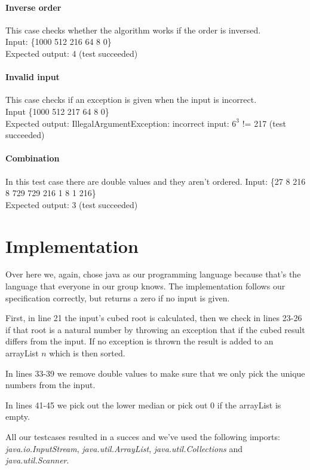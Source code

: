 \documentclass[12pt]{article}
\begin{document}
\paragraph{Inverse order}
This case checks whether the algorithm works if the order is inversed. \\
Input: \{1000 512 216 64 8 0\} \\
Expected output: 4 (test succeeded)

\paragraph{Invalid input}
This case checks if an exception is given when the input is incorrect. \\
Input \{1000 512 217 64 8 0\} \\
Expected output: IllegalArgumentException: incorrect input: $6^3$ != 217 (test succeeded)

\paragraph{Combination}
In this test case there are double values and they aren't ordered.
Input: \{27 8 216 8 729 729 216 1 8 1 216\} \\
Expected output: 3 (test succeeded)

\section{Implementation}
Over here we, again, chose java as our programming language because that's the language that everyone in our group knows. The implementation follows our specification correctly, but returns a zero if no input is given.

First, in line 21 the input's cubed root is calculated, then we check in lines 23-26 if that root is a natural number by throwing an exception that if the cubed result differs from the input. If no exception is thrown the result is added to an arrayList $n$ which is then sorted.

In lines 33-39 we remove double values to make sure that we only pick the unique numbers from the input.

In lines 41-45 we pick out the lower median or pick out 0 if the arrayList is empty.

All our testcases resulted in a succes and we've used the following imports: \textsl{java.io.InputStream}, \textsl{java.util.ArrayList}, \textsl{java.util.Collections} and \textsl{java.util.Scanner}.
\end{document}

